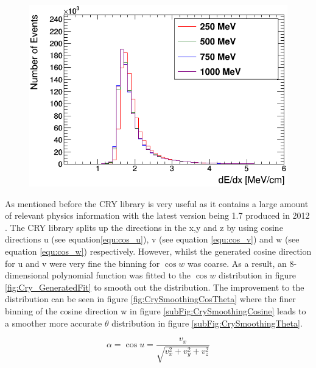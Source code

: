 \begin{figure}[!h]
 \centering
 \includegraphics[width=0.7\linewidth]{Chapter4/Figs/Raster/year1Plots/muons_per_mev_cm.png}
 \label{fig:mev_per_cm_muons}
\end{figure}

As mentioned before the CRY library is very useful as it contains a large amount of relevant physics information with the latest version being 1.7 produced in 2012 \cite{hagmann2012cosmicCry}. The CRY library splits up the directions in the x,y and z by using cosine directions u (see equation\ref{equ:cos_u}), v (see equation \ref{equ:cos_v}) and w (see equation \ref{equ:cos_w}) respectively. However, whilst the generated cosine direction for u and v were very fine the binning for $\cos{w}$ was coarse. As a result, an 8-dimensional polynomial function was fitted to the $\cos{w}$ distribution in figure \ref{fig:Cry_GeneratedFit} to smooth out the distribution. The improvement to the distribution can be seen in figure \ref{fig:CrySmoothingCosTheta} where the finer binning of the cosine direction w in figure \ref{subFig:CrySmoothingCosine} leads to a smoother more accurate $\theta$ distribution in figure \ref{subFig:CrySmoothingTheta}. 

\begin{equation}
\alpha = \cos{u} = \frac{v_x}{\sqrt{v_x^2+v_y^2+v_z^2}}
\label{equ:cos_u}
\end{equation}

